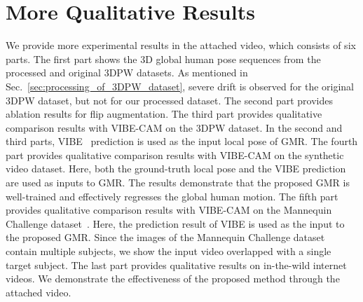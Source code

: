 \documentclass[10pt,twocolumn,letterpaper]{article}
\begin{document}
\section{More Qualitative Results}
\label{sec:qualitative_results}

We provide more experimental results in the attached video, which consists of six parts. The first part shows the 3D global human pose sequences from the processed and original 3DPW datasets. As mentioned in Sec.~\ref{sec:processing_of_3DPW_dataset}, severe drift is observed for the original 3DPW dataset, but not for our processed dataset. The second part provides ablation results for flip augmentation. The third part provides qualitative comparison results with VIBE-CAM on the 3DPW dataset. In the second and third parts, VIBE~\cite{kocabas2020vibe} prediction is used as the input local pose of GMR. The fourth part provides qualitative comparison results with VIBE-CAM on the synthetic video dataset. Here, both the ground-truth local pose and the VIBE prediction are used as inputs to GMR. The results demonstrate that the proposed GMR is well-trained and effectively regresses the global human motion. The fifth part provides qualitative comparison results with VIBE-CAM on the Mannequin Challenge dataset~\cite{li2019learning}. Here, the prediction result of VIBE is used as the input to the proposed GMR. Since the images of the Mannequin Challenge dataset contain multiple subjects, we show the input video overlapped with a single target subject. The last part provides qualitative results on in-the-wild internet videos. We demonstrate the effectiveness of the proposed method through the attached video.






{\small


}
\end{document}
